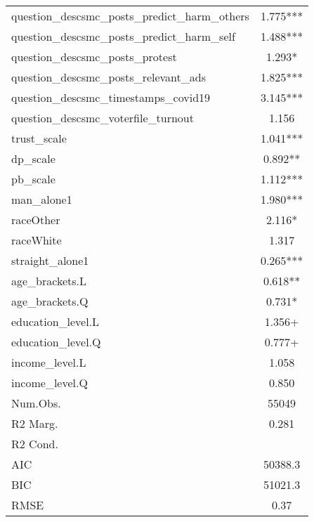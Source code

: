 \begin{table}
\begin{tabular}[t]{lc}
question\_descsmc\_posts\_predict\_harm\_others & \num{1.775}***\\
question\_descsmc\_posts\_predict\_harm\_self & \num{1.488}***\\
question\_descsmc\_posts\_protest & \num{1.293}*\\
question\_descsmc\_posts\_relevant\_ads & \num{1.825}***\\
question\_descsmc\_timestamps\_covid19 & \num{3.145}***\\
question\_descsmc\_voterfile\_turnout & \num{1.156}\\
trust\_scale & \num{1.041}***\\
dp\_scale & \num{0.892}**\\
pb\_scale & \num{1.112}***\\
man\_alone1 & \num{1.980}***\\
raceOther & \num{2.116}*\\
raceWhite & \num{1.317}\\
straight\_alone1 & \num{0.265}***\\
age\_brackets.L & \num{0.618}**\\
age\_brackets.Q & \num{0.731}*\\
education\_level.L & \num{1.356}+\\
education\_level.Q & \num{0.777}+\\
income\_level.L & \num{1.058}\\
income\_level.Q & \num{0.850}\\
\midrule
Num.Obs. & \num{55049}\\
R2 Marg. & \num{0.281}\\
R2 Cond. & \\
AIC & \num{50388.3}\\
BIC & \num{51021.3}\\
RMSE & \num{0.37}\\
\bottomrule
\end{tabular}
\end{table}
